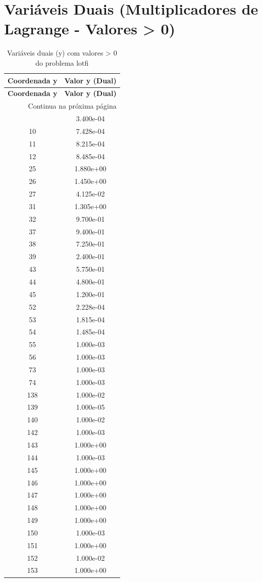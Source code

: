\documentclass[12pt]{article}
\begin{document}
\section{Variáveis Duais (Multiplicadores de Lagrange - Valores > 0)}

\begin{longtable}{@{}cc@{}}
\caption{Variáveis duais (y) com valores > 0 do problema lotfi} \\
\toprule
\textbf{Coordenada y} & \textbf{Valor y (Dual)} \\
\midrule
\endfirsthead

\toprule
\textbf{Coordenada y} & \textbf{Valor y (Dual)} \\
\midrule
\endhead

\midrule \multicolumn{2}{r}{{Continua na próxima página}} \\ \midrule
\endfoot

\bottomrule
\endlastfoot
9 & 3.400e-04 \\
10 & 7.428e-04 \\
11 & 8.215e-04 \\
12 & 8.485e-04 \\
25 & 1.880e+00 \\
26 & 1.450e+00 \\
27 & 4.125e-02 \\
31 & 1.305e+00 \\
32 & 9.700e-01 \\
37 & 9.400e-01 \\
38 & 7.250e-01 \\
39 & 2.400e-01 \\
43 & 5.750e-01 \\
44 & 4.800e-01 \\
45 & 1.200e-01 \\
52 & 2.228e-04 \\
53 & 1.815e-04 \\
54 & 1.485e-04 \\
55 & 1.000e-03 \\
56 & 1.000e-03 \\
73 & 1.000e-03 \\
74 & 1.000e-03 \\
138 & 1.000e-02 \\
139 & 1.000e-05 \\
140 & 1.000e-02 \\
142 & 1.000e-03 \\
143 & 1.000e+00 \\
144 & 1.000e-03 \\
145 & 1.000e+00 \\
146 & 1.000e+00 \\
147 & 1.000e+00 \\
148 & 1.000e+00 \\
149 & 1.000e+00 \\
150 & 1.000e-03 \\
151 & 1.000e+00 \\
152 & 1.000e-02 \\
153 & 1.000e+00 \\

\bottomrule
\end{longtable}
\end{document}
